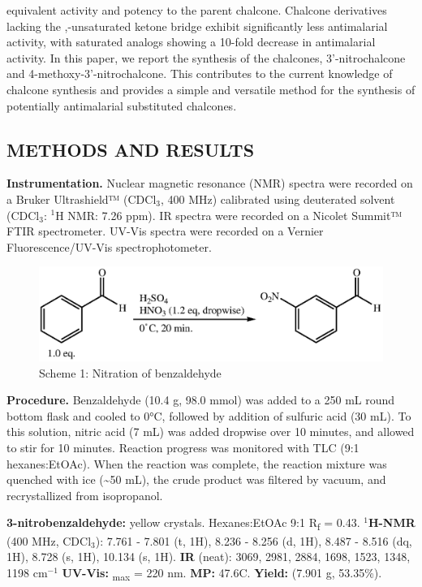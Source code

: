 \documentclass[11pt]{article}
\let\bf\textbf
\begin{document}
equivalent activity and potency to the parent chalcone.\cite{Larsen2005} Chalcone derivatives lacking the \textalpha,\textbeta-unsaturated ketone bridge exhibit significantly less antimalarial activity, with saturated analogs showing a 10-fold decrease in antimalarial activity.\cite{Li1995} In this paper, we report the synthesis of the chalcones, 3'-nitrochalcone and 4-methoxy-3'-nitrochalcone. This contributes to the current knowledge of chalcone synthesis and provides a simple and versatile method for the synthesis of potentially antimalarial substituted chalcones.
\subsection*{METHODS AND RESULTS}
\bf{Instrumentation.} Nuclear magnetic resonance (NMR) spectra were recorded on a Bruker Ultrashield™ (CDCl$_3$, 400 MHz) calibrated using deuterated solvent (CDCl$_3$: $^1$H NMR: 7.26 ppm). IR spectra were recorded on a Nicolet Summit™ FTIR spectrometer. UV-Vis spectra were recorded on a Vernier Fluorescence/UV-Vis spectrophotometer.

\begin{figure}[H]
    \centering
    \includegraphics[scale=0.8]{schemes/nitration.eps}
    \captionsetup{labelformat=empty}
    \caption{Scheme 1: Nitration of benzaldehyde}
\end{figure}
\bf{Procedure.} Benzaldehyde (10.4 g, 98.0 mmol) was added to a 250 mL round bottom flask and cooled to 0°C, followed by addition of sulfuric acid (30 mL). To this solution, nitric acid (7 mL) was added dropwise over 10 minutes, and allowed to stir for 10 minutes. Reaction progress was monitored with TLC (9:1 hexanes:EtOAc). When the reaction was complete, the reaction mixture was quenched with ice (\textasciitilde 50 mL), the crude product was filtered by vacuum, and recrystallized from isopropanol.

\noindent\bf{3-nitrobenzaldehyde:} yellow crystals. Hexanes:EtOAc 9:1 R\textsubscript{f} = 0.43. \bf{$^1$H-NMR} (400 MHz, CDCl$_3$): \textdelta\hspace{0mm} 7.761 - 7.801 (t, 1H), 8.236 - 8.256 (d, 1H), 8.487 - 8.516 (dq, 1H), 8.728 (s, 1H), 10.134 (s, 1H). \bf{IR} (neat): 3069, 2981, 2884, 1698, 1523, 1348, 1198 cm$^{-1}$ \bf{UV-Vis:} \textlambda\textsubscript{max} = 220 nm. \bf{MP:} 47.6\degree C. \bf{Yield:} (7.901 g, 53.35\%).
\end{document}
